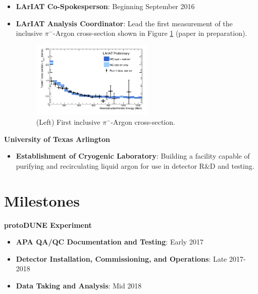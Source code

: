 \begin{itemize}[noitemsep,nolistsep]
\item{\textbf{LArIAT Co-Spokesperson}}: Beginning September 2016

\item{\textbf{LArIAT Analysis Coordinator}}: Lead the first measurement of the inclusive $\pi^{-}$-Argon cross-section shown in Figure \ref{fig:LArIATCrossSection} (paper in preparation).

\begin{figure}[htb]
\centering
\includegraphics[width=0.55\textwidth]{images/LArIATCrossSection.png}
\caption[]{(Left) First inclusive $\pi^{-}$-Argon cross-section.}
\label{fig:LArIATCrossSection}
\end{figure}


\end{itemize}

\noindent\textbf{University of Texas Arlington}

\begin{itemize}[noitemsep,nolistsep]
\item{\textbf{Establishment of Cryogenic Laboratory}}: Building a facility capable of purifying and recirculating liquid argon for use in detector R$\&$D and testing.
\end{itemize}


\section*{\textbf{Milestones}}

\noindent\textbf{protoDUNE Experiment}
\begin{itemize}[noitemsep,nolistsep]
\item{\textbf{APA QA/QC Documentation and Testing}}: Early 2017
\item{\textbf{Detector Installation, Commissioning, and Operations}}: Late 2017-2018
\item{\textbf{Data Taking and Analysis}}: Mid 2018
\end{itemize}

